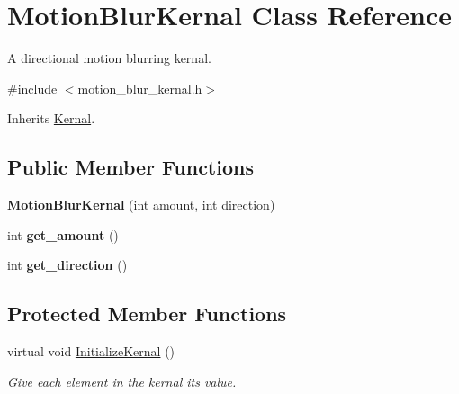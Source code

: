 \hypertarget{classMotionBlurKernal}{}\section{Motion\+Blur\+Kernal Class Reference}
\label{classMotionBlurKernal}


A directional motion blurring kernal.  




{\ttfamily \#include $<$motion\+\_\+blur\+\_\+kernal.\+h$>$}



Inherits \hyperlink{classKernal}{Kernal}.

\subsection*{Public Member Functions}
\begin{DoxyCompactItemize}
\item 
{\bfseries Motion\+Blur\+Kernal} (int amount, int direction)\hypertarget{classMotionBlurKernal_a610ed56394ea95d8176444b6da802566}{}\label{classMotionBlurKernal_a610ed56394ea95d8176444b6da802566}

\item 
int {\bfseries get\+\_\+amount} ()\hypertarget{classMotionBlurKernal_a4045ec3751aff2b75259653b75181415}{}\label{classMotionBlurKernal_a4045ec3751aff2b75259653b75181415}

\item 
int {\bfseries get\+\_\+direction} ()\hypertarget{classMotionBlurKernal_a2a229add81ae4cd17d3c23813f0714cb}{}\label{classMotionBlurKernal_a2a229add81ae4cd17d3c23813f0714cb}

\end{DoxyCompactItemize}
\subsection*{Protected Member Functions}
\begin{DoxyCompactItemize}
\item 
virtual void \hyperlink{classMotionBlurKernal_a79623d08eed4ac6e253c322fa55a3726}{Initialize\+Kernal} ()
\begin{DoxyCompactList}\small\item\em Give each element in the kernal it\textquotesingle{}s value. \end{DoxyCompactList}\end{DoxyCompactItemize}
